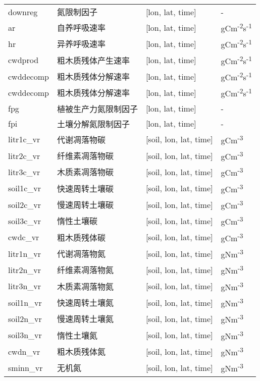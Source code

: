 \documentclass[a4paper,12pt,twoside]{article}
\begin{document}
\begin{longtable}[htbp]{lp{}ll}
downreg & 氮限制因子 & {[}lon, lat, time{]}  & - \\
ar & 自养呼吸速率 & {[}lon, lat, time{]}  & gCm\textsuperscript{-2}s\textsuperscript{-1} \\
hr & 异养呼吸速率 &  {[}lon, lat, time{]}  & gCm\textsuperscript{-2}s\textsuperscript{-1} \\
cwdprod & 粗木质残体产生速率 &  {[}lon, lat, time{]}  & gCm\textsuperscript{-2}s\textsuperscript{-1} \\
cwddecomp & 粗木质残体分解速率 &  {[}lon, lat, time{]}  & gCm\textsuperscript{-2}s\textsuperscript{-1} \\
cwddecomp & 粗木质残体分解速率 &  {[}lon, lat, time{]}  & gCm\textsuperscript{-2}s\textsuperscript{-1} \\
fpg & 植被生产力氮限制因子 &  {[}lon, lat, time{]}  & - \\
fpi & 土壤分解氮限制因子 &  {[}lon, lat, time{]}  & - \\
litr1c\_vr & 代谢凋落物碳 & {[}soil, lon, lat, time{]}  & gCm\textsuperscript{-3} \\
litr2c\_vr & 纤维素凋落物碳 & {[}soil, lon, lat, time{]}  & gCm\textsuperscript{-3} \\
litr3c\_vr & 木质素凋落物碳 & {[}soil, lon, lat, time{]}  & gCm\textsuperscript{-3} \\
soil1c\_vr & 快速周转土壤碳 & {[}soil, lon, lat, time{]}  & gCm\textsuperscript{-3} \\
soil2c\_vr & 慢速周转土壤碳 & {[}soil, lon, lat, time{]}  & gCm\textsuperscript{-3} \\
soil3c\_vr & 惰性土壤碳 & {[}soil, lon, lat, time{]}  & gCm\textsuperscript{-3} \\
cwdc\_vr & 粗木质残体碳 & {[}soil, lon, lat, time{]}  & gCm\textsuperscript{-3} \\
litr1n\_vr & 代谢凋落物氮 & {[}soil, lon, lat, time{]}  & gNm\textsuperscript{-3} \\
litr2n\_vr & 纤维素凋落物氮 & {[}soil, lon, lat, time{]}  & gNm\textsuperscript{-3} \\
litr3n\_vr & 木质素凋落物氮 & {[}soil, lon, lat, time{]}  & gNm\textsuperscript{-3} \\
soil1n\_vr & 快速周转土壤氮 & {[}soil, lon, lat, time{]}  & gNm\textsuperscript{-3} \\
soil2n\_vr & 慢速周转土壤氮 & {[}soil, lon, lat, time{]}  & gNm\textsuperscript{-3} \\
soil3n\_vr & 惰性土壤氮 & {[}soil, lon, lat, time{]}  & gNm\textsuperscript{-3} \\
cwdn\_vr & 粗木质残体氮 & {[}soil, lon, lat, time{]}  & gNm\textsuperscript{-3} \\
sminn\_vr & 无机氮 & {[}soil, lon, lat, time{]}  & gNm\textsuperscript{-3} \\
\end{longtable}
\end{document}
